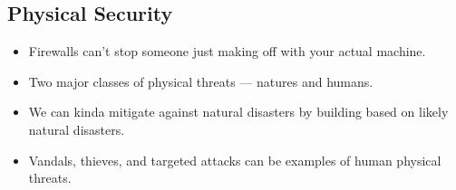 \documentclass{article}
\begin{document}
\subsection{Physical Security}
\begin{itemize}
    \item Firewalls can't stop someone just making off with your actual machine.
    \item Two major classes of physical threats --- natures and humans.
    \item We can kinda mitigate against natural disasters by building based on likely natural disasters.
    \item Vandals, thieves, and targeted attacks can be examples of human physical threats.
\end{itemize}
\end{document}

